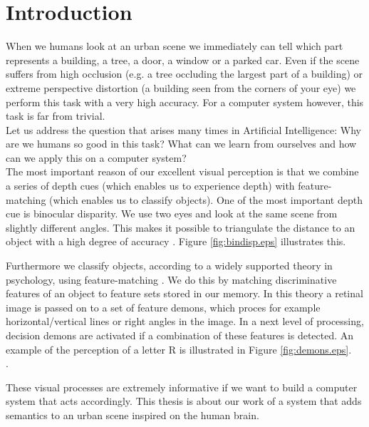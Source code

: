 \section{Introduction}
When we humans look at an urban scene we immediately can tell which part
represents a building, a tree, a door, a window or a parked car.
Even if the scene suffers from high occlusion (e.g. a tree occluding the largest part
of a building) or extreme perspective distortion (a building seen from the
corners of your eye) we perform this task with a very high accuracy.
For a computer system however, this task is far from trivial.\\

Let us address the question that arises many times in Artificial Intelligence:
Why are we humans so good in this task? What can we learn from ourselves 
and how can we apply this on a computer system?\\

The most important reason of our excellent visual perception is that we combine 
a series of depth cues \cite{psy} (which enables us to experience depth) with
feature-matching (which enables us to classify objects).
One of the most important depth cue is binocular disparity.  We use two eyes and look at
the same scene from slightly different angles.  This makes it possible to
triangulate the distance to an object with a high degree of accuracy \cite{psy} \cite{hartley}.
Figure \ref{fig:bindisp.eps} illustrates this.\\ 

\newpage
Furthermore we classify objects, according to a widely supported theory in
psychology, using feature-matching \cite{anderson} \cite{psy}. 
We do this by matching discriminative features of
an object to feature sets stored in our memory. In this theory 
a retinal image is passed on to a set of feature demons, which proces for example
horizontal/vertical lines or right angles in the image.  In a next level 
of processing, decision demons are activated if a combination of these features is detected.
An example of the perception of a letter R is illustrated in Figure
\ref{fig:demons.eps}.\\

.

These visual processes are extremely informative if we want to build a computer system
that acts accordingly.  This thesis is about our work of a system that adds semantics to an
urban scene inspired on the human brain.  \\


